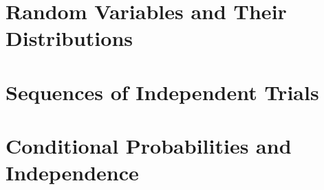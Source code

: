 \documentclass{report}
\begin{document}

\chapter{Random Variables and Their Distributions}

\chapter{Sequences of Independent Trials}

% 
\chapter{Conditional Probabilities and Independence}

\end{document}
